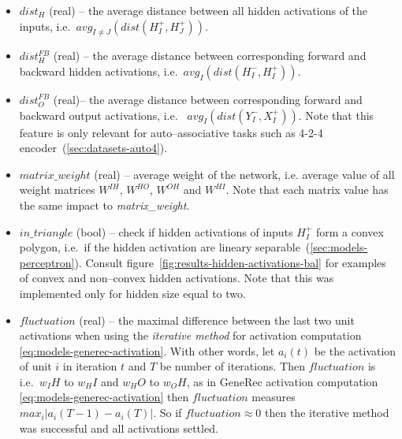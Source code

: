 \begin{itemize} 
\label{sec:our-h-dist} 
\item $dist_{H}$ (real) -- the average distance between all hidden activations of the inputs, i.e.~$avg_{I \neq J}\left(dist(H_I^{+},H_J^{+})\right)$. %

\label{sec:our-dist-h-fb}
\item $dist_{H}^{FB}$ (real) -- the average distance between corresponding forward and backward hidden activations, i.e.~$avg_{I}\left(dist(H_I^{-},H_I^{+})\right)$.

\label{sec:our-dist-o-fb}
\item	$dist_{O}^{FB}$ (real)-- the average distance between corresponding forward and backward output activations, i.e.~  $avg_{I}\left(dist(Y_I^{-},X_I^{+})\right)$. Note that this feature is only relevant for auto--associative tasks such as 4-2-4 encoder~(\ref{sec:datasets-auto4}). 

\label{sec:our-m-wei}
\item $matrix\_weight$ (real) -- average weight of the network, i.e. average value of all weight matrices $W^{IH}$, $W^{HO}$, $W^{OH}$ and $W^{HI}$. Note that each matrix value has the same impact to \emph{matrix\_weight}. 


\label{sec:our-in-triangle}
\item $in\_triangle$ (bool) -- check if hidden activations of inputs  $H_I^{+}$ form a convex polygon, i.e.~if the hidden activation are lineary separable~(\ref{sec:models-perceptron}). Consult figure~\ref{fig:results-hidden-activations-bal} for examples of convex and non--convex hidden activations. Note that this was implemented only for hidden size equal to two. %

\label{sec:our-fluctuation}
\item $fluctuation$ (real) -- the maximal difference between the last two unit activations when using the \emph{iterative method} for activation computation \ref{eq:models-generec-activation}. With other words, let $a_i(t)$ be the activation of unit $i$ in iteration $t$ and $T$ be number of iterations. Then $fluctuation$ is i.e.~$w_IH$ to $w_HI$ and $w_HO$ to $w_OH$, as in GeneRec activation computation \ref{eq:models-generec-activation} then $fluctuation$ measures $max_i|a_i(T-1) - a_i(T)|$. So if $fluctuation \approx 0$ then the iterative method was successful and all activations settled.
\end{itemize} 

